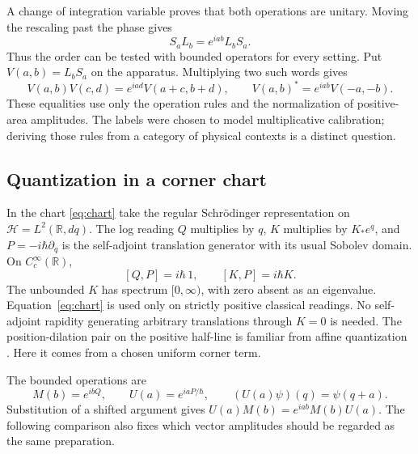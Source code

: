 \documentclass[11pt,letterpaper]{article}
\begin{document}
A change of integration variable proves that both operations are unitary. Moving the rescaling past the phase gives
\begin{equation}
 S_a L_b=e^{iab}L_b S_a .
 \label{eq:phase}
\end{equation}
Thus the order can be tested with bounded operators for every setting. Put $V(a,b)=L_bS_a$ on the apparatus. Multiplying two such words gives
\begin{equation}
 V(a,b)V(c,d)=e^{iad}V(a+c,b+d),\qquad
 V(a,b)^*=e^{iab}V(-a,-b).
 \label{eq:words}
\end{equation}
These equalities use only the operation rules and the normalization of positive-area amplitudes. The labels were chosen to model multiplicative calibration; deriving those rules from a category of physical contexts is a distinct question.

\subsection{Quantization in a corner chart}

In the chart \eqref{eq:chart} take the regular Schr\"odinger representation on $\mathcal H=L^2(\mathbb R,dq)$. The log reading $Q$ multiplies by $q$, $K$ multiplies by $K_*e^q$, and $P=-i\hbar\partial_q$ is the self-adjoint translation generator with its usual Sobolev domain. On $C_c^\infty(\mathbb R)$,
\[
 [Q,P]=i\hbar\,1,\qquad [K,P]=i\hbar K .
\]
The unbounded $K$ has spectrum $[0,\infty)$, with zero absent as an eigenvalue. Equation~\eqref{eq:chart} is used only on strictly positive classical readings. No self-adjoint rapidity generating arbitrary translations through $K=0$ is needed. The position-dilation pair on the positive half-line is familiar from affine quantization \cite[Sec.~2.1]{klauder}. Here it comes from a chosen uniform corner term.

The bounded operations are
\[
 M(b)=e^{ibQ},\qquad U(a)=e^{iaP/\hbar},\qquad
 (U(a)\psi)(q)=\psi(q+a).
\]
Substitution of a shifted argument gives $U(a)M(b)=e^{iab}M(b)U(a)$. The following comparison also fixes which vector amplitudes should be regarded as the same preparation.
\end{document}
